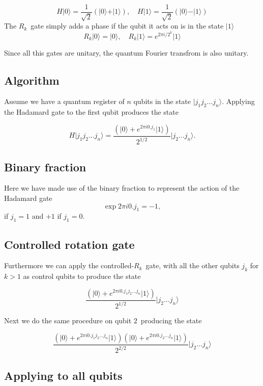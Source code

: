 \documentclass[%
oneside,                 %
final,                   %
10pt]{article}
\begin{document}
\[
H\vert 0 \rangle = \frac{1}{\sqrt{2}} \left(\vert 0 \rangle + \vert 1\rangle\right), \quad H\vert 1\rangle = \frac{1}{\sqrt{2}} \left(\vert 0 \rangle - \vert 1\rangle\right)
\]
The $R_k$ gate simply adds a phase if the qubit it acts on is in the state $\vert 1\rangle$
\[
    R_k\vert 0 \rangle = \vert 0 \rangle, \quad R_k\vert 1\rangle = e^{2\pi i/2^{k}}\vert 1\rangle
\]

Since all this gates are unitary, the quantum Fourier transfrom is also unitary.

\subsection{Algorithm}

Assume we have a quantum register of $n$ qubits in the state $\vert j_1 j_2 \dots j_n\rangle$.
Applying the Hadamard gate to the first qubit
produces the state

\[
H\vert j_1 j_2 \dots j_n\rangle = \frac{\left(\vert 0 \rangle + e^{2\pi i 0.j_1}\vert 1\rangle\right)}{2^{1/2}} \vert j_2 \dots j_n\rangle.
\]

\subsection{Binary fraction}

Here we have made use of the binary fraction to represent the action of the Hadamard gate 
\[
\exp{2\pi i 0.j_1} = -1,
\]
if $j_1 = 1$ and $+1$ if $j_1 = 0$.

\subsection{Controlled rotation gate}

Furthermore we can apply the controlled-$R_k$ gate, with all the other qubits $j_k$ for $k>1$ as control qubits to produce the state

\[
\frac{\left(\vert 0 \rangle + e^{2\pi i 0.j_1j_2\dots j_n}\vert 1\rangle\right)}{2^{1/2}} \vert j_2 \dots j_n\rangle
\]

Next we do the same procedure on qubit $2$ producing the state

\[
\frac{\left(\vert 0 \rangle + e^{2\pi i 0.j_1j_2\dots j_n}\vert 1\rangle\right)\left(\vert 0 \rangle + e^{2\pi i 0.j_2\dots j_n}\vert 1\rangle\right)}{2^{2/2}} \vert j_2 \dots j_n\rangle
\]

\subsection{Applying to all qubits}
\end{document}
